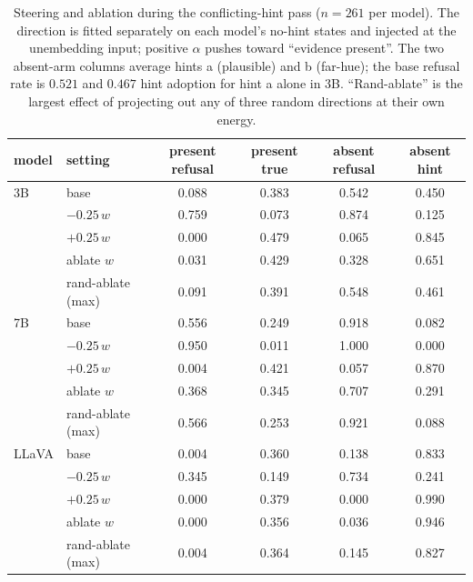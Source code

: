 \documentclass[10pt]{article}
\newcommand{\wdir}{w}
\begin{document}
\begin{table}[t]
\centering
\small
\setlength{\tabcolsep}{4.5pt}
\caption{Steering and ablation during the conflicting-hint pass ($n=261$ per model). The direction is fitted separately on each model's no-hint states and injected at the unembedding input; positive $\alpha$ pushes toward ``evidence present''. The two absent-arm columns average hints a (plausible) and b (far-hue); the base refusal rate is $0.521$ and $0.467$ hint adoption for hint a alone in 3B. ``Rand-ablate'' is the largest effect of projecting out any of three random directions at their own energy.}
\label{tab:causal}
\begin{tabular}{llcccc}
\toprule
model & setting & present refusal & present true & absent refusal & absent hint \\
\midrule
3B & base & 0.088 & 0.383 & 0.542 & 0.450 \\
   & $-0.25\,\wdir$ & 0.759 & 0.073 & 0.874 & 0.125 \\
   & $+0.25\,\wdir$ & 0.000 & 0.479 & 0.065 & 0.845 \\
   & ablate $\wdir$ & 0.031 & 0.429 & 0.328 & 0.651 \\
   & rand-ablate (max) & 0.091 & 0.391 & 0.548 & 0.461 \\
\midrule
7B & base & 0.556 & 0.249 & 0.918 & 0.082 \\
   & $-0.25\,\wdir$ & 0.950 & 0.011 & 1.000 & 0.000 \\
   & $+0.25\,\wdir$ & 0.004 & 0.421 & 0.057 & 0.870 \\
   & ablate $\wdir$ & 0.368 & 0.345 & 0.707 & 0.291 \\
   & rand-ablate (max) & 0.566 & 0.253 & 0.921 & 0.088 \\
\midrule
LLaVA & base & 0.004 & 0.360 & 0.138 & 0.833 \\
   & $-0.25\,\wdir$ & 0.345 & 0.149 & 0.734 & 0.241 \\
   & $+0.25\,\wdir$ & 0.000 & 0.379 & 0.000 & 0.990 \\
   & ablate $\wdir$ & 0.000 & 0.356 & 0.036 & 0.946 \\
   & rand-ablate (max) & 0.004 & 0.364 & 0.145 & 0.827 \\
\bottomrule
\end{tabular}
\end{table}
\end{document}
